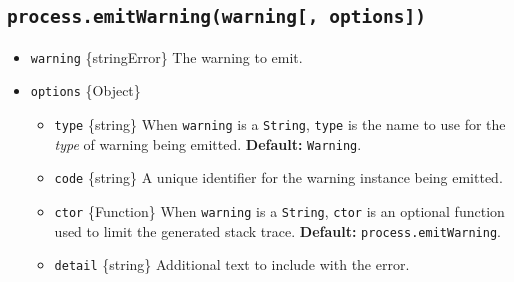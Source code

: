 \begin{Shaded}
\begin{Highlighting}[]
\OperatorTok{=} \NormalTok{(}\NormalTok{)}\OperatorTok{;}
\OperatorTok{=} \NormalTok{(}\NormalTok{)}\OperatorTok{;}
\OperatorTok{=} \NormalTok{(}\NormalTok{)}\OperatorTok{;}

\OperatorTok{=}\NormalTok{ \{ }\OperatorTok{:}\NormalTok{ \{\} \}}\OperatorTok{;}
\OperatorTok{,} \NormalTok{(}\OperatorTok{,} \NormalTok{)}\OperatorTok{,}\NormalTok{)}\OperatorTok{;}
\NormalTok{()}\OperatorTok{;}
\end{Highlighting}
\end{Shaded}

\subsection{\texorpdfstring{\texttt{process.emitWarning(warning{[},\ options{]})}}{process.emitWarning(warning{[}, options{]})}}\label{process.emitwarningwarning-options}

\begin{itemize}
\tightlist
\item
  \texttt{warning} \{string\textbar Error\} The warning to emit.
\item
  \texttt{options} \{Object\}

  \begin{itemize}
  \tightlist
  \item
    \texttt{type} \{string\} When \texttt{warning} is a \texttt{String},
    \texttt{type} is the name to use for the \emph{type} of warning
    being emitted. \textbf{Default:}
    \texttt{\textquotesingle{}Warning\textquotesingle{}}.
  \item
    \texttt{code} \{string\} A unique identifier for the warning
    instance being emitted.
  \item
    \texttt{ctor} \{Function\} When \texttt{warning} is a
    \texttt{String}, \texttt{ctor} is an optional function used to limit
    the generated stack trace. \textbf{Default:}
    \texttt{process.emitWarning}.
  \item
    \texttt{detail} \{string\} Additional text to include with the
    error.
  \end{itemize}
\end{itemize}

